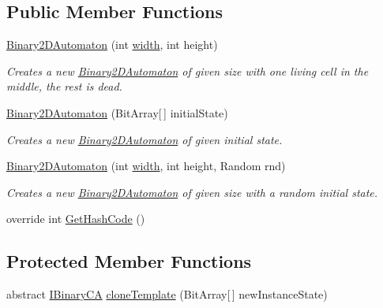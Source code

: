\subsection*{Public Member Functions}
\begin{DoxyCompactItemize}
\item 
\hyperlink{class_cellular_1_1_binary2_d_automaton_a6956aa8cc05e4d00c116d8cc5e8528d4}{Binary2\+D\+Automaton} (int \hyperlink{class_cellular_1_1_automaton2_d_a1e9e5ec637c747a859c346839c90d174}{width}, int height)
\begin{DoxyCompactList}\small\item\em Creates a new {\ttfamily \hyperlink{class_cellular_1_1_binary2_d_automaton}{Binary2\+D\+Automaton}} of given size with one living cell in the middle, the rest is dead. \end{DoxyCompactList}\item 
\hyperlink{class_cellular_1_1_binary2_d_automaton_ab2bdc13f759e29b0efe84995c74e5006}{Binary2\+D\+Automaton} (Bit\+Array\mbox{[}$\,$\mbox{]} initial\+State)
\begin{DoxyCompactList}\small\item\em Creates a new {\ttfamily \hyperlink{class_cellular_1_1_binary2_d_automaton}{Binary2\+D\+Automaton}} of given initial state. \end{DoxyCompactList}\item 
\hyperlink{class_cellular_1_1_binary2_d_automaton_a465d87aeab9f265595e942e46308f75f}{Binary2\+D\+Automaton} (int \hyperlink{class_cellular_1_1_automaton2_d_a1e9e5ec637c747a859c346839c90d174}{width}, int height, Random rnd)
\begin{DoxyCompactList}\small\item\em Creates a new {\ttfamily \hyperlink{class_cellular_1_1_binary2_d_automaton}{Binary2\+D\+Automaton}} of given size with a random initial state. \end{DoxyCompactList}\item 
override int \hyperlink{class_cellular_1_1_binary2_d_automaton_af0b06d58b66367dbeb712f2c4237ff54}{Get\+Hash\+Code} ()
\end{DoxyCompactItemize}
\subsection*{Protected Member Functions}
\begin{DoxyCompactItemize}
\item 
abstract \hyperlink{interface_cellular_1_1_i_binary_c_a}{I\+Binary\+C\+A} \hyperlink{class_cellular_1_1_binary2_d_automaton_ad2d31668c7b8f8e959575e03b995273f}{clone\+Template} (Bit\+Array\mbox{[}$\,$\mbox{]} new\+Instance\+State)
\end{DoxyCompactItemize}
